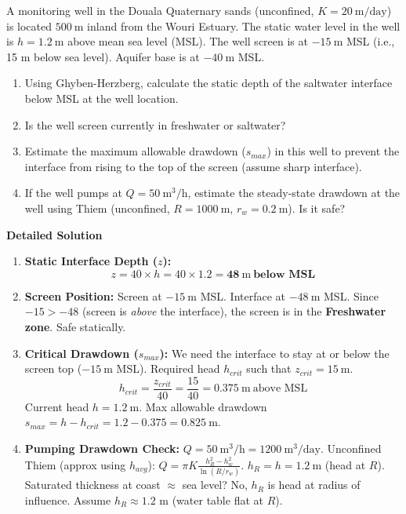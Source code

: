\documentclass[11pt]{article}
\begin{document}
\begin{exoresolu}
A monitoring well in the Douala Quaternary sands (unconfined, $K=20\ \mathrm{m/day}$) is located $500\ \mathrm{m}$ inland from the Wouri Estuary. The static water level in the well is $h = 1.2\ \mathrm{m}$ above mean sea level (MSL). The well screen is at $-15\ \mathrm{m}$ MSL (i.e., 15 m below sea level). Aquifer base is at $-40\ \mathrm{m}$ MSL.
\begin{enumerate}
    \item Using Ghyben-Herzberg, calculate the static depth of the saltwater interface below MSL at the well location.
    \item Is the well screen currently in freshwater or saltwater?
    \item Estimate the maximum allowable drawdown ($s_{max}$) in this well to prevent the interface from rising to the top of the screen (assume sharp interface).
    \item If the well pumps at $Q = 50\ \mathrm{m^3/h}$, estimate the steady-state drawdown at the well using Thiem (unconfined, $R=1000\ \mathrm{m}$, $r_w=0.2\ \mathrm{m}$). Is it safe?
\end{enumerate}
\tcblower
\textbf{Detailed Solution}
\begin{enumerate}
    \item \textbf{Static Interface Depth ($z$):}
    \[ z = 40 \times h = 40 \times 1.2 = \mathbf{48\ \mathrm{m}\ \text{below MSL}} \]
    \item \textbf{Screen Position:} Screen at $-15\ \mathrm{m}$ MSL. Interface at $-48\ \mathrm{m}$ MSL.
    Since $-15 > -48$ (screen is \emph{above} the interface), the screen is in the \textbf{Freshwater zone}. Safe statically.
    \item \textbf{Critical Drawdown ($s_{max}$):}
    We need the interface to stay at or below the screen top ($-15\ \mathrm{m}$ MSL).
    Required head $h_{crit}$ such that $z_{crit} = 15\ \mathrm{m}$.
    \[ h_{crit} = \frac{z_{crit}}{40} = \frac{15}{40} = 0.375\ \mathrm{m}\ \text{above MSL} \]
    Current head $h = 1.2\ \mathrm{m}$.
    Max allowable drawdown $s_{max} = h - h_{crit} = 1.2 - 0.375 = \mathbf{0.825\ \mathrm{m}}$.
    \item \textbf{Pumping Drawdown Check:}
    $Q = 50\ \mathrm{m^3/h} = 1200\ \mathrm{m^3/day}$.
    Unconfined Thiem (approx using $h_{avg}$): $Q = \pi K \frac{h_R^2 - h_w^2}{\ln(R/r_w)}$.
    $h_R = h = 1.2\ \mathrm{m}$ (head at $R$). Saturated thickness at coast $\approx$ sea level? No, $h_R$ is head at radius of influence. Assume $h_R \approx 1.2$ m (water table flat at $R$).

\end{enumerate}
\end{exoresolu}
\end{document}

